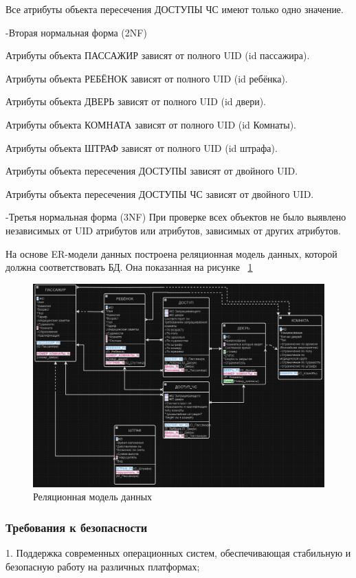 Все атрибуты объекта пересечения ДОСТУПЫ ЧС имеют только одно значение.


-Вторая нормальная форма (2NF)

Атрибуты объекта ПАССАЖИР зависят от полного UID (id пассажира).

Атрибуты объекта РЕБЁНОК зависят от полного UID (id ребёнка).

Атрибуты объекта ДВЕРЬ зависят от полного UID (id двери).

Атрибуты объекта КОМНАТА зависят от полного UID (id Комнаты).

Атрибуты объекта ШТРАФ зависят от полного UID (id штрафа).

Атрибуты объекта пересечения ДОСТУПЫ зависят от двойного UID.

Атрибуты объекта пересечения ДОСТУПЫ ЧС зависят от двойного UID.


-Третья нормальная форма (3NF)
При проверке всех объектов не было выявлено независимых от UID атрибутов или атрибутов, зависимых от других атрибутов.

На основе ER-модели данных построена реляционная модель данных, которой должна соответствовать БД. Она показанная на рисунке  ~\ref{fig:commonscheme3}

\begin{figure}[ht]
	\centering
	\includegraphics[width=1\linewidth]{images/CommonScheme3}
	\caption{Реляционная модель данных}
	\label{fig:commonscheme3}
\end{figure}

\subsubsection{Требования к безопасности}
1. Поддержка современных операционных систем, обеспечивающая стабильную и безопасную работу на различных платформах;

